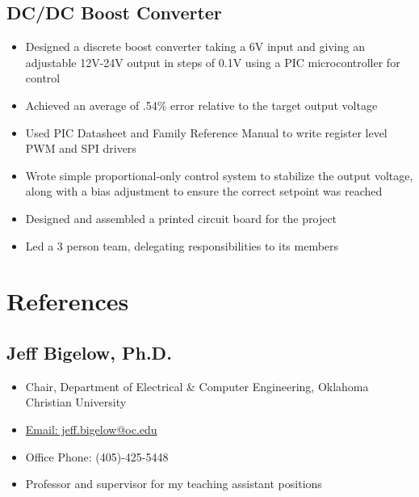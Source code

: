 \documentclass{article}
\begin{document}
\begin{spacing}{.5}
	\subsection{DC/DC Boost Converter \hfill {}}
		\begin{itemize}[label=--,itemsep=-.35ex]
			\item \large{Designed a discrete boost converter taking a 6V input and giving an adjustable 12V-24V output in steps of 0.1V using a PIC microcontroller for control}
			\item \large{Achieved an average of .54\% error relative to the target output voltage}
			\item \large{Used PIC Datasheet and Family Reference Manual to write register level PWM and SPI drivers}
			\item \large{Wrote simple proportional-only control system to stabilize the output voltage, along with a bias adjustment to ensure the correct setpoint was reached}
			\item \large{Designed and assembled a printed circuit board for the project}
			\item \large{Led a 3 person team, delegating responsibilities to its members}
		\end{itemize}
\begin{comment}
	\subsection{RGB Laser Scanner Controller}
		\begin{itemize}[label=--,itemsep=-.35ex]
			\item \large{}
		\end{itemize}
\end{comment}

\section{References}
	\subsection{Jeff Bigelow, Ph.D.}
		\begin{itemize}[label=--,itemsep=-.35ex]
			\item \large{Chair, Department of Electrical \& Computer Engineering, Oklahoma Christian University}
			\item \large{\href{mailto::jeff.bigelow@oc.edu}{\large{Email: jeff.bigelow@oc.edu}}}
			\item \large{Office Phone: (405)-425-5448}
			\item \large{Professor and supervisor for my teaching assistant positions}
		\end{itemize}

\end{spacing}
\end{document}
